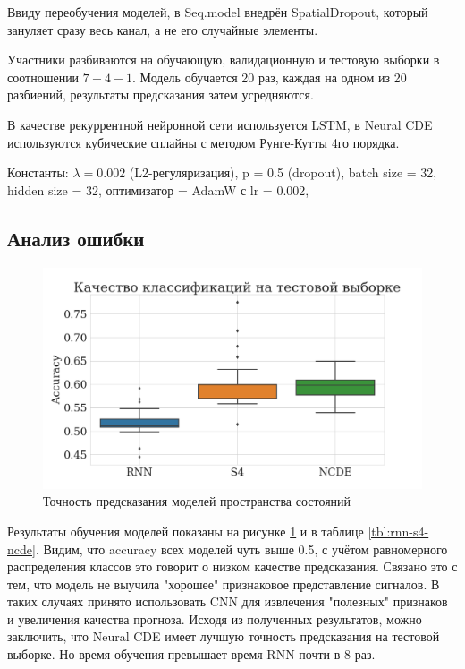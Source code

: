 \documentclass[a4paper, 12pt]{article}
\begin{document}
	Ввиду переобучения моделей, в Seq.model внедрён SpatialDropout, который зануляет сразу весь канал, а не его случайные элементы.
	
	Участники разбиваются на обучающую, валидационную и тестовую выборки в соотношении $7-4-1$. Модель обучается 20 раз, каждая на одном из 20 разбиений, результаты предсказания затем усредняются.
	
	В качестве рекуррентной нейронной сети используется LSTM, в Neural CDE используются кубические сплайны с методом Рунге-Кутты 4го порядка. 
	
	Константы: $\lambda = 0.002$ (L2-регуляризация), p = 0.5 (dropout), batch size = 32, hidden size = 32, оптимизатор = AdamW с lr = 0.002, 
	
	\subsection{Анализ ошибки}
	\begin{figure}[bhtp]
		\includegraphics[width=\textwidth]{rnn-s4-ncde.png}
		\caption{Точность предсказания моделей пространства состояний}
		\label{fig:accuracy-analysis}
	\end{figure}

	Результаты обучения моделей показаны на рисунке \ref{fig:accuracy-analysis} и в  таблице \ref{tbl:rnn-s4-ncde}. Видим, что accuracy всех моделей чуть выше 0.5, с учётом равномерного распределения классов это говорит о низком качестве предсказания. Связано это с тем, что модель не выучила "хорошее" признаковое представление сигналов. В таких случаях принято использовать CNN для извлечения "полезных" признаков и увеличения качества прогноза.
	Исходя из полученных результатов, можно заключить, что Neural CDE имеет лучшую точность предсказания на тестовой выборке. Но время обучения превышает время RNN почти в 8 раз.
\end{document}
